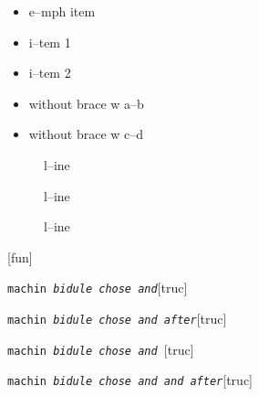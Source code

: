 \documentclass{book}
\begin{document}
\begin{titlepage}
\begin{itemize}[label=\emph{} after emph]
\item e--mph item
\end{itemize}

\begin{itemize}[label=\textbullet{} a--n itemize line]
\item i--tem 1
\item i--tem 2
\end{itemize}

\begin{itemize}[label={}]
\item without brace w a--b
\item without brace w c--d
\end{itemize}

\begin{description}
\item[{\parbox[b]{\linewidth}{%
a}}]
l--ine
\end{description}

\begin{description}
\item[{\parbox[b]{\linewidth}{%
a--missing style formatting}}]
l--ine
\end{description}

\begin{description}
\item[{\parbox[b]{\linewidth}{%
a\\
\index[fn]{a@\texttt{a}}%
\index[cp]{index entry between item and itemx}%
b
\index[fn]{b@\texttt{b}}%
}}]
l--ine
\end{description}

\noindent\texttt{}\hfill[fun]



\noindent\texttt{machin \EmbracOn{}\textnormal{\textsl{bidule chose and}}\EmbracOff{}}\hfill[truc]



%
\noindent\texttt{machin \EmbracOn{}\textnormal{\textsl{bidule chose and  after}}\EmbracOff{}}\hfill[truc]



%
\noindent\texttt{machin \EmbracOn{}\textnormal{\textsl{bidule chose and }}\EmbracOff{}}\hfill[truc]



%
\noindent\texttt{machin \EmbracOn{}\textnormal{\textsl{bidule chose and and after}}\EmbracOff{}}\hfill[truc]




\end{titlepage}
\end{document}
